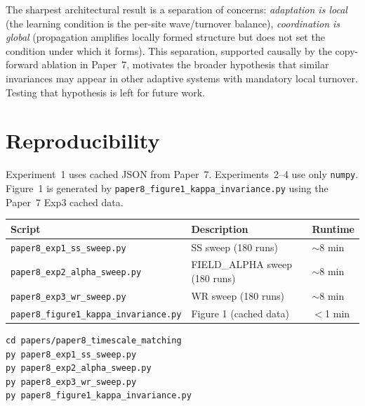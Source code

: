 \documentclass[11pt]{article}
\theoremstyle{remark}
\begin{document}
The sharpest architectural result is a separation of concerns: \emph{adaptation is
local} (the learning condition is the per-site wave/turnover balance),
\emph{coordination is global} (propagation amplifies locally formed structure but
does not set the condition under which it forms). This separation, supported
causally by the copy-forward ablation in Paper~7, motivates the broader hypothesis
that similar invariances may appear in other adaptive systems with mandatory local
turnover. Testing that hypothesis is left for future work.

\appendix
\section{Reproducibility}

Experiment~1 uses cached JSON from Paper~7. Experiments~2--4 use only
\texttt{numpy}. Figure~1 is generated by \texttt{paper8\_figure1\_kappa\_invariance.py}
using the Paper~7 Exp3 cached data.

\begin{center}
\begin{tabular}{lll}
\toprule
Script & Description & Runtime \\
\midrule
\texttt{paper8\_exp1\_ss\_sweep.py}    & SS sweep (180 runs)           & $\sim$8 min \\
\texttt{paper8\_exp2\_alpha\_sweep.py} & FIELD\_ALPHA sweep (180 runs) & $\sim$8 min \\
\texttt{paper8\_exp3\_wr\_sweep.py}    & WR sweep (180 runs)           & $\sim$8 min \\
\texttt{paper8\_figure1\_kappa\_invariance.py} & Figure 1 (cached data) & $<$1 min \\
\bottomrule
\end{tabular}
\end{center}

\begin{lstlisting}[caption={Run all experiments and generate figure.}]
cd papers/paper8_timescale_matching
py paper8_exp1_ss_sweep.py
py paper8_exp2_alpha_sweep.py
py paper8_exp3_wr_sweep.py
py paper8_figure1_kappa_invariance.py
\end{lstlisting}
\end{document}
